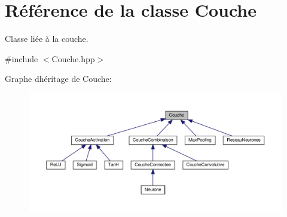 \hypertarget{classCouche}{}\section{Référence de la classe Couche}
\label{classCouche}


Classe liée à la couche.  




{\ttfamily \#include $<$Couche.\+hpp$>$}



Graphe d\textquotesingle{}héritage de Couche\+:
\nopagebreak
\begin{figure}[H]
\begin{center}
\leavevmode
\includegraphics[width=350pt]{classCouche__inherit__graph}
\end{center}
\end{figure}
